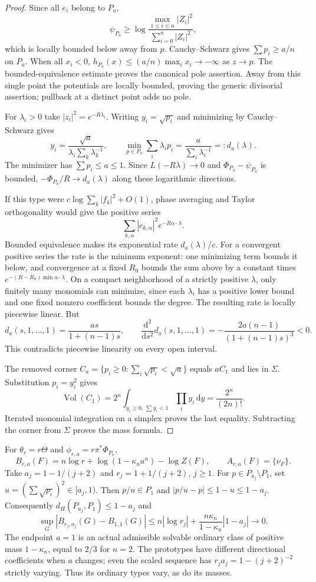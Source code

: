 \documentclass[11pt]{article}
\newcommand{\Vol}{\operatorname{Vol}}
\begin{document}
\begin{proof}
Since all $e_i$ belong to $P_a$,
\[
 \psi_{P_a}\ge
 \log\frac{\max_{1\le i\le n}|Z_i|^2}{\sum_{i=0}^n|Z_i|^2},
\]
which is locally bounded below away from $p$.
Cauchy--Schwarz gives $\sum p_i\ge a/n$ on $P_a$. When all $x_i<0$,
$h_{P_a}(x)\le(a/n)\max_i x_i\to-\infty$ as $z\to p$.
The bounded-equivalence estimate proves the canonical pole assertion.
Away from this single point the potentials are locally bounded, proving
the generic divisorial assertion; pullback at a distinct point adds no pole.

For $\lambda_i>0$ take $|z_i|^2=e^{-R\lambda_i}$.
Writing $y_i=\sqrt{p_i}$ and minimizing by Cauchy--Schwarz gives
\[
 y_i=\frac{\sqrt a}{\lambda_i\sum_k\lambda_k^{-1}},\qquad
 \min_{p\in P_a}\sum_i\lambda_i p_i
       =\frac a{\sum_i\lambda_i^{-1}}=:d_a(\lambda).
\]
The minimizer has $\sum p_i\le a\le1$.
Since $L(-R\lambda)\to0$ and $\Phi_{P_a}-\psi_{P_a}$ is bounded,
$-\Phi_{P_a}/R\to d_a(\lambda)$ along these logarithmic directions.

If this type were $c\log\sum_k|f_k|^2+O(1)$, phase averaging and Taylor
orthogonality would give the positive series
\[
 \sum_{k,\alpha}|c_{k,\alpha}|^2e^{-R\alpha\cdot\lambda}.
\]
Bounded equivalence makes its exponential rate $d_a(\lambda)/c$.
For a convergent positive series the rate is the minimum exponent:
one minimizing term bounds it below, and convergence at a fixed $R_0$
bounds the sum above by a constant times
$e^{-(R-R_0)\min\alpha\cdot\lambda}$.
On a compact neighborhood of a strictly positive $\lambda$, only
finitely many monomials can minimize, since each $\lambda_i$ has a
positive lower bound and one fixed nonzero coefficient bounds the degree.
The resulting rate is locally piecewise linear. But
\[
 d_a(s,1,\ldots,1)=\frac{as}{1+(n-1)s},\qquad
 \frac{\mathrm d^2}{\mathrm ds^2}d_a(s,1,\ldots,1)
   =-\frac{2a(n-1)}{(1+(n-1)s)^3}<0.
\]
This contradicts piecewise linearity on every open interval.

The removed corner $C_a=\{p_i\ge0:\sum_i\sqrt{p_i}<\sqrt a\}$
equals $aC_1$ and lies in $\Sigma$. Substitution $p_i=y_i^2$ gives
\[
 \Vol(C_1)=2^n\int_{y_i\ge0,\,\sum y_i<1}\prod_i y_i\,\mathrm dy
          =\frac{2^n}{(2n)!}.
\]
Iterated monomial integration on a simplex proves the last equality.
Subtracting the corner from $\Sigma$ proves the mass formula.
\end{proof}

For $\theta_r=r\Theta$ and $\phi_{r,a}=r\pi^*\Phi_{P_a}$,
\[
 B_{r,a}(F)=n\log r+\log(1-\kappa_n a^n)-\log Z(F),
 \qquad A_{r,a}(F)=\{\nu_F\}.
\]
Take $a_j=1-1/(j+2)$ and $r_j=1+1/(j+2)$, $j\ge1$.
For $p\in P_{a_j}\setminus P_1$, set $u=(\sum\sqrt{p_i})^2\in[a_j,1)$.
Then $p/u\in P_1$ and $|p/u-p|\le1-u\le1-a_j$.
Consequently $d_H(P_{a_j},P_1)\le1-a_j$ and
\[
 \sup_G|B_{r_j,a_j}(G)-B_{1,1}(G)|
 \le n|\log r_j|+\frac{n\kappa_n}{1-\kappa_n}|1-a_j|\longrightarrow0.
\]
The endpoint $a=1$ is an actual admissible solvable ordinary class of
positive mass $1-\kappa_n$, equal to $2/3$ for $n=2$.
The prototypes have different directional coefficients when $a$ changes;
even the scaled sequence has $r_ja_j=1-(j+2)^{-2}$ strictly varying.
Thus its ordinary types vary, as do its masses.
\end{document}
